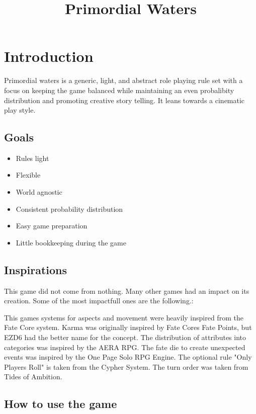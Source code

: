 \documentclass[11pt]{article}
\date{}
\title{Primordial Waters}
\begin{document}
\maketitle
\tableofcontents

{

\newpage
\section{Introduction}
\label{sec:orga392018}

Primordial waters is a generic, light, and abstract role playing rule set with a focus on keeping the game balanced while maintaining an even probalibity distribution and promoting creative story telling. It leans towards a cinematic play style.
\subsection{Goals}
\label{sec:org270b68b}

\begin{itemize}
\item Rules light
\item Flexible
\item World agnostic
\item Consistent probability distribution
\item Easy game preparation
\item Little bookkeeping during the game
\end{itemize}
\subsection{Inspirations}
\label{sec:org508bce0}

This game did not come from nothing. Many other games had an impact on its creation. Some of the most impactfull ones are the following.:

This games systems for aspects and movement were heavily inspired from the Fate Core system.
Karma was originally inspired by Fate Cores Fate Points, but EZD6 had the better name for the concept.
The distribution of attributes into categories was inspired by the AERA RPG.
The fate die to create unexpected events was inspired by the One Page Solo RPG Engine.
The optional rule "Only Players Roll" is taken from the Cypher System.
The turn order was taken from Tides of Ambition.
\subsection{How to use the game}
\label{sec:org40b263e}

}
\end{document}
